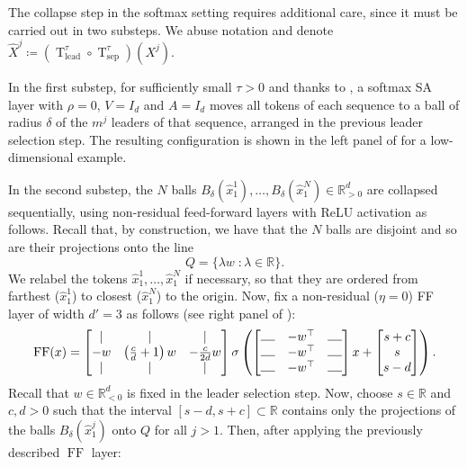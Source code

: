 \documentclass[pdflatex,sn-mathphys-num]{sn-jnl}%
\theoremstyle{thmstyleone}%
\theoremstyle{thmstyletwo}%
\theoremstyle{thmstylethree}%
\numberwithin{equation}{section}
\newcommand{\R}{\mathbb{R}}
\DeclareMathOperator{\T}{\mathrm{T}}
\DeclareMathOperator{\FF}{\mathrm{FF}}
\begin{document}
The collapse step in the softmax setting requires additional care, since it must be carried out in two substeps. We abuse notation and denote $\hat{X}^j \coloneqq (\T_\text{lead}^\tau \circ \T_\text{sep}^\tau) (X^j)$.

In the first substep, for sufficiently small $\tau > 0$ and thanks to , a softmax SA layer with $\rho = 0$, $V = I_d$ and $A = I_d$ moves all tokens of each sequence to a ball of radius $\delta$ of the $m^j$ leaders of that sequence, arranged in the previous leader selection step. The resulting configuration is shown in the left panel of  for a low-dimensional example.

In the second substep, the $N$ balls $B_\delta (\hat{x}_1^1), \dots,B_\delta (\hat{x}_1^N) \in \R^d_{>0}$ are collapsed sequentially, using non-residual feed-forward layers with ReLU activation as follows. Recall that, by construction, we have that the $N$ balls are disjoint and so are their projections onto the line 
$$
Q = \{ \lambda w \; : \lambda \in \R \}.
$$ 
We relabel the tokens $\hat{x}_1^1, \dots, \hat{x}_1^N$ if necessary, so that they are ordered from farthest ($\hat{x}_1^1$) to closest ($\hat{x}_1^N$) to the origin. Now, fix a non-residual ($\eta = 0$) FF layer of width $d'=3$ as follows (see right panel of ):
$$
\FF(x) =
\begin{bmatrix}
\vert & \vert & \vert \\
-w & \left(\tfrac{c}{d} + 1\right) w & -\tfrac{c}{2d} w \\
\vert & \vert & \vert
\end{bmatrix}
\sigma \left(
\begin{bmatrix}
\rule{0.4cm}{0.4pt} & - w^\top & \rule{0.4cm}{0.4pt} \\
\rule{0.4cm}{0.4pt} & - w^\top & \rule{0.4cm}{0.4pt} \\
\rule{0.4cm}{0.4pt} & - w^\top & \rule{0.4cm}{0.4pt} \\
\end{bmatrix} x +
\begin{bmatrix}
s + c \\
s \\
s - d
\end{bmatrix}
\right).
$$
Recall that $w\in \R^d_{<0}$ is fixed in the leader selection step. Now, choose $s\in \R$ and $c, d > 0$ such that the interval $[s - d, s + c] \subset \R$ contains only the projections of the balls $B_\delta (\hat{x}_1^{j})$ onto $Q$ for all $j > 1$. Then, after applying the previously described $\FF$ layer:
\end{document}
